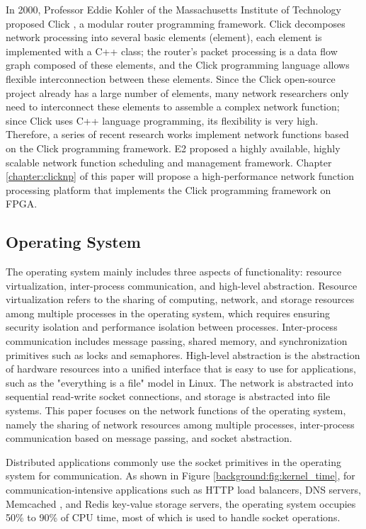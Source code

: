 In 2000, Professor Eddie Kohler of the Massachusetts Institute of Technology proposed Click \cite{kohler2000click}, a modular router programming framework. Click decomposes network processing into several basic elements (element), each element is implemented with a C++ class; the router's packet processing is a data flow graph composed of these elements, and the Click programming language allows flexible interconnection between these elements. Since the Click open-source project already has a large number of elements, many network researchers only need to interconnect these elements to assemble a complex network function; since Click uses C++ language programming, its flexibility is very high. Therefore, a series of recent research works \cite{martins2014clickos,netbricks} implement network functions based on the Click programming framework. E2 \cite{palkar2015e2} proposed a highly available, highly scalable network function scheduling and management framework. Chapter \ref{chapter:clicknp} of this paper will propose a high-performance network function processing platform that implements the Click programming framework on FPGA.

\subsection{Operating System}

The operating system mainly includes three aspects of functionality: resource virtualization, inter-process communication, and high-level abstraction. Resource virtualization refers to the sharing of computing, network, and storage resources among multiple processes in the operating system, which requires ensuring security isolation and performance isolation between processes. Inter-process communication includes message passing, shared memory, and synchronization primitives such as locks and semaphores. High-level abstraction is the abstraction of hardware resources into a unified interface that is easy to use for applications, such as the "everything is a file" model in Linux. The network is abstracted into sequential read-write socket connections, and storage is abstracted into file systems. This paper focuses on the network functions of the operating system, namely the sharing of network resources among multiple processes, inter-process communication based on message passing, and socket abstraction.

Distributed applications commonly use the socket primitives in the operating system for communication. As shown in Figure \ref{background:fig:kernel_time}, for communication-intensive applications such as HTTP load balancers, DNS servers, Memcached \cite{memcached}, and Redis \cite{redis} key-value storage servers, the operating system occupies 50\% to 90\% of CPU time, most of which is used to handle socket operations.


